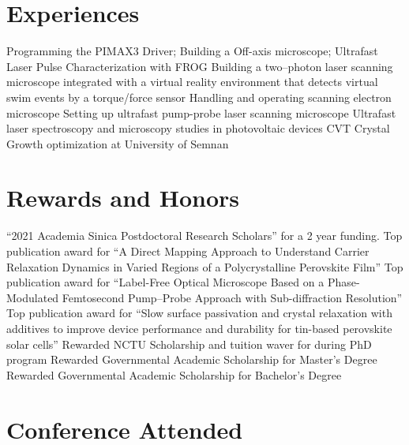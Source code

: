 \documentclass[11pt,a4paper]{moderncv}
\begin{document}
\section{Experiences}
		{Programming the PIMAX3 Driver; Building a Off-axis microscope; 
		Ultrafast Laser Pulse Characterization with FROG}
		{Building a two--photon laser scanning microscope 
		integrated with a virtual reality environment 
		that detects virtual swim events by a torque/force sensor}
		{Handling and operating scanning electron microscope}
		{Setting up ultrafast pump-probe laser scanning microscope}
		{Ultrafast laser spectroscopy and microscopy
	studies in photovoltaic devices }
		{CVT Crystal Growth optimization at University of Semnan}
\section{Rewards and Honors}
		{``2021 Academia Sinica Postdoctoral 
		Research Scholars'' for a 2 year funding.}
		{Top publication award for ``A Direct Mapping 
		Approach to Understand Carrier Relaxation 
		Dynamics in Varied Regions of a 
		Polycrystalline Perovskite Film''}
		{Top publication award for ``Label-Free Optical 
		Microscope Based on a Phase-Modulated Femtosecond 
		Pump–Probe Approach with Sub-diffraction Resolution''}
		{Top publication award for ``Slow surface 
		passivation and crystal relaxation with additives to 
		improve device performance and durability for tin-based 
		perovskite solar cells''}
		{Rewarded NCTU Scholarship and tuition waver 
		for during PhD program}
		{Rewarded Governmental Academic Scholarship 
		for Master's Degree}
		{Rewarded Governmental Academic Scholarship 
		for Bachelor's Degree}
\section{Conference Attended}
\end{document}

